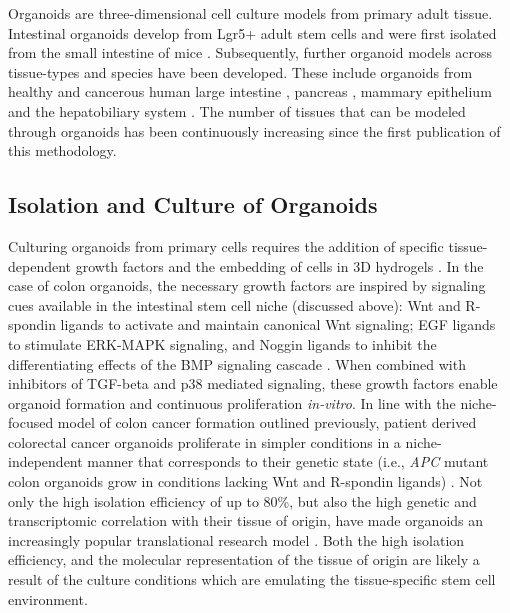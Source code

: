 \begin{flushleft}
Organoids are three-dimensional cell culture models from primary adult tissue. Intestinal organoids develop from Lgr5+ adult stem cells and were first isolated from the small intestine of mice \parencite{satoSingleLgr5Stem2009}. Subsequently, further organoid models across tissue-types and species have been developed. These include organoids from healthy and cancerous human large intestine \parencite{satoLongtermExpansionEpithelial2011}, pancreas \parencite{driehuisPancreaticCancerOrganoids2019}, mammary epithelium \parencite{zhangEstablishingEstrogenresponsiveMouse2017, sachsLivingBiobankBreast2018} and the hepatobiliary system \parencite{huchVitroExpansionSingle2013}. The number of tissues that can be modeled through organoids has been continuously increasing since the first publication of this methodology.

\subsection{Isolation and Culture of Organoids}

Culturing organoids from primary cells requires the addition of specific tissue-dependent growth factors and the embedding of cells in 3D hydrogels \parencite{merkerGastrointestinalOrganoidsHow2016}. In the case of colon organoids, the necessary growth factors are inspired by signaling cues available in the intestinal stem cell niche (discussed above): Wnt and R-spondin ligands to activate and maintain canonical Wnt signaling; EGF ligands to stimulate ERK-MAPK signaling, and Noggin ligands to inhibit the differentiating effects of the BMP signaling cascade \parencite{satoGrowingSelforganizingMiniguts2013}. When combined with inhibitors of TGF-beta and p38 mediated signaling, these growth factors enable organoid formation and continuous proliferation \textit{in-vitro}. In line with the niche-focused model of colon cancer formation outlined previously, patient derived colorectal cancer organoids proliferate in simpler conditions in a niche-independent manner that corresponds to their genetic state (i.e., \textit{APC} mutant colon organoids grow in conditions lacking Wnt and R-spondin ligands) \parencite{Fujii2016-ax}. Not only the high isolation efficiency of up to 80\%, but also the high genetic and transcriptomic correlation with their tissue of origin, have made organoids an increasingly popular translational research model \parencite{pauliPersonalizedVitroVivo2017a}. Both the high isolation efficiency, and the molecular representation of the tissue of origin are likely a result of the culture conditions which are emulating the tissue-specific stem cell environment. \par


\end{flushleft}
